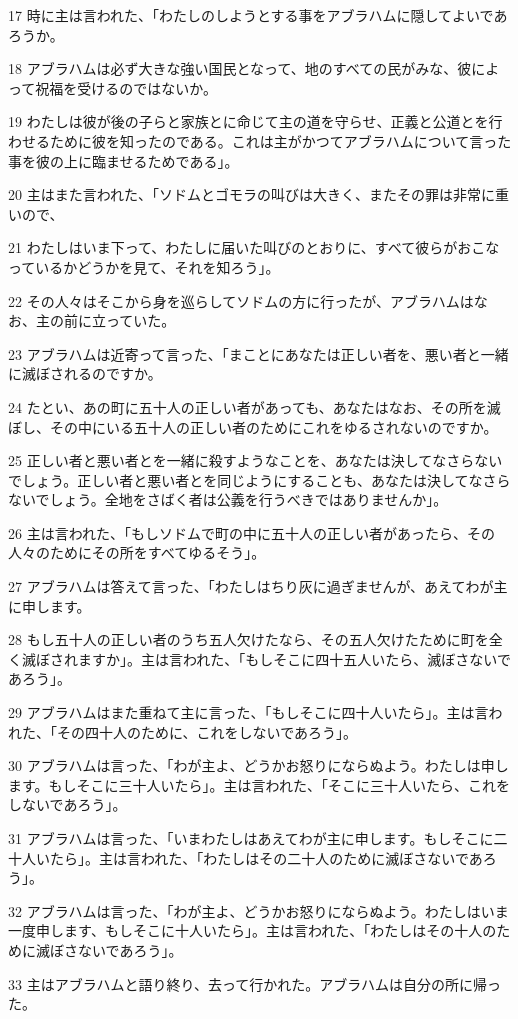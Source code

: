 \par 17 時に主は言われた、「わたしのしようとする事をアブラハムに隠してよいであろうか。
\par 18 アブラハムは必ず大きな強い国民となって、地のすべての民がみな、彼によって祝福を受けるのではないか。
\par 19 わたしは彼が後の子らと家族とに命じて主の道を守らせ、正義と公道とを行わせるために彼を知ったのである。これは主がかつてアブラハムについて言った事を彼の上に臨ませるためである」。
\par 20 主はまた言われた、「ソドムとゴモラの叫びは大きく、またその罪は非常に重いので、
\par 21 わたしはいま下って、わたしに届いた叫びのとおりに、すべて彼らがおこなっているかどうかを見て、それを知ろう」。
\par 22 その人々はそこから身を巡らしてソドムの方に行ったが、アブラハムはなお、主の前に立っていた。
\par 23 アブラハムは近寄って言った、「まことにあなたは正しい者を、悪い者と一緒に滅ぼされるのですか。
\par 24 たとい、あの町に五十人の正しい者があっても、あなたはなお、その所を滅ぼし、その中にいる五十人の正しい者のためにこれをゆるされないのですか。
\par 25 正しい者と悪い者とを一緒に殺すようなことを、あなたは決してなさらないでしょう。正しい者と悪い者とを同じようにすることも、あなたは決してなさらないでしょう。全地をさばく者は公義を行うべきではありませんか」。
\par 26 主は言われた、「もしソドムで町の中に五十人の正しい者があったら、その人々のためにその所をすべてゆるそう」。
\par 27 アブラハムは答えて言った、「わたしはちり灰に過ぎませんが、あえてわが主に申します。
\par 28 もし五十人の正しい者のうち五人欠けたなら、その五人欠けたために町を全く滅ぼされますか」。主は言われた、「もしそこに四十五人いたら、滅ぼさないであろう」。
\par 29 アブラハムはまた重ねて主に言った、「もしそこに四十人いたら」。主は言われた、「その四十人のために、これをしないであろう」。
\par 30 アブラハムは言った、「わが主よ、どうかお怒りにならぬよう。わたしは申します。もしそこに三十人いたら」。主は言われた、「そこに三十人いたら、これをしないであろう」。
\par 31 アブラハムは言った、「いまわたしはあえてわが主に申します。もしそこに二十人いたら」。主は言われた、「わたしはその二十人のために滅ぼさないであろう」。
\par 32 アブラハムは言った、「わが主よ、どうかお怒りにならぬよう。わたしはいま一度申します、もしそこに十人いたら」。主は言われた、「わたしはその十人のために滅ぼさないであろう」。
\par 33 主はアブラハムと語り終り、去って行かれた。アブラハムは自分の所に帰った。

